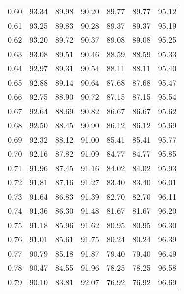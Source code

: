 \begin{tabular}{|c|c|c|c|c|c|c|}
      0.60 &     93.34 &     89.98 &      90.20 &   89.77 &      89.77 &         95.12 \\
      0.61 &     93.25 &     89.83 &      90.28 &   89.37 &      89.37 &         95.19 \\
      0.62 &     93.20 &     89.72 &      90.37 &   89.08 &      89.08 &         95.25 \\
      0.63 &     93.08 &     89.51 &      90.46 &   88.59 &      88.59 &         95.33 \\
      0.64 &     92.97 &     89.31 &      90.54 &   88.11 &      88.11 &         95.40 \\
      0.65 &     92.88 &     89.14 &      90.64 &   87.68 &      87.68 &         95.47 \\
      0.66 &     92.75 &     88.90 &      90.72 &   87.15 &      87.15 &         95.54 \\
      0.67 &     92.64 &     88.69 &      90.82 &   86.67 &      86.67 &         95.62 \\
      0.68 &     92.50 &     88.45 &      90.90 &   86.12 &      86.12 &         95.69 \\
      0.69 &     92.32 &     88.12 &      91.00 &   85.41 &      85.41 &         95.77 \\
      0.70 &     92.16 &     87.82 &      91.09 &   84.77 &      84.77 &         95.85 \\
      0.71 &     91.96 &     87.45 &      91.16 &   84.02 &      84.02 &         95.93 \\
      0.72 &     91.81 &     87.16 &      91.27 &   83.40 &      83.40 &         96.01 \\
      0.73 &     91.64 &     86.83 &      91.39 &   82.70 &      82.70 &         96.11 \\
      0.74 &     91.36 &     86.30 &      91.48 &   81.67 &      81.67 &         96.20 \\
      0.75 &     91.18 &     85.96 &      91.62 &   80.95 &      80.95 &         96.30 \\
      0.76 &     91.01 &     85.61 &      91.75 &   80.24 &      80.24 &         96.39 \\
      0.77 &     90.79 &     85.18 &      91.87 &   79.40 &      79.40 &         96.49 \\
      0.78 &     90.47 &     84.55 &      91.96 &   78.25 &      78.25 &         96.58 \\
      0.79 &     90.10 &     83.81 &      92.07 &   76.92 &      76.92 &         96.69 \\

\end{tabular}
